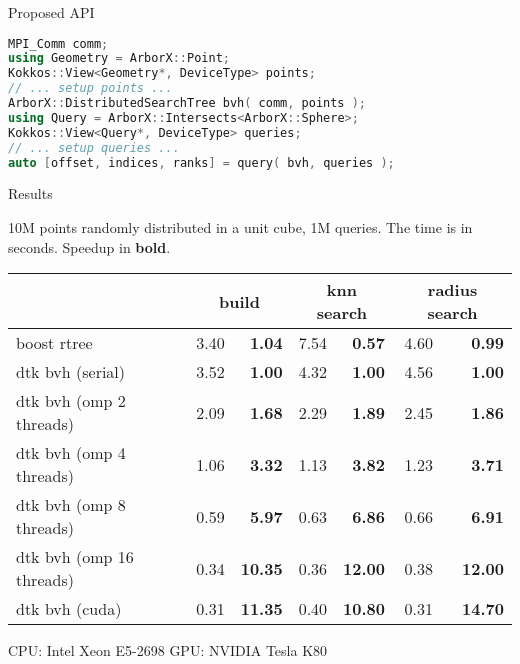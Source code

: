 \documentclass[final,hyperref={pdfpagelabels=false}]{beamer}
\begin{document}
\begin{frame}[t,fragile]
\begin{columns}[t]
\begin{column}{.480\textwidth}
\begin{block}{\centering Proposed API}

\begin{lstlisting}[language=C++]
MPI_Comm comm;
using Geometry = ArborX::Point;
Kokkos::View<Geometry*, DeviceType> points;
// ... setup points ...
ArborX::DistributedSearchTree bvh( comm, points );
using Query = ArborX::Intersects<ArborX::Sphere>;
Kokkos::View<Query*, DeviceType> queries;
// ... setup queries ...
auto [offset, indices, ranks] = query( bvh, queries );
\end{lstlisting}

\end{block}

\begin{block}{\centering Results}


10M points randomly distributed in a unit cube, 1M queries. The time is in seconds. Speedup in {\bf bold}.
\begin{table}
  \centering
  \begin{tabular}{l@{\hskip 50pt}cr@{\hskip 50pt}cr@{\hskip 50pt}cr}
    \toprule
                             & \multicolumn{2}{c}{build}    & \multicolumn{2}{c}{knn search} & \multicolumn{2}{c}{radius search} \\
    \midrule
    boost rtree              & 3.40   & {\bf 1.04}   & 7.54       & {\bf 0.57}   & 4.60          & {\bf 0.99} \\
    dtk bvh (serial)         & 3.52   & {\bf 1.00}   & 4.32       & {\bf 1.00}   & 4.56          & {\bf 1.00} \\
    dtk bvh (omp 2 threads)  & 2.09   & {\bf 1.68}   & 2.29       & {\bf 1.89}   & 2.45          & {\bf 1.86} \\
    dtk bvh (omp 4 threads)  & 1.06   & {\bf 3.32}   & 1.13       & {\bf 3.82}   & 1.23          & {\bf 3.71} \\
    dtk bvh (omp 8 threads)  & 0.59   & {\bf 5.97}   & 0.63       & {\bf 6.86}   & 0.66          & {\bf 6.91} \\
    dtk bvh (omp 16 threads) & 0.34   & {\bf 10.35}  & 0.36       & {\bf 12.00}  & 0.38          & {\bf 12.00}\\
    dtk bvh (cuda)           & 0.31   & {\bf 11.35}  & 0.40       & {\bf 10.80}  & 0.31          & {\bf 14.70}\\
    \bottomrule
  \end{tabular}
\end{table}
\begin{center}
  \small
  CPU: Intel Xeon E5-2698 \qquad GPU: NVIDIA Tesla K80
\end{center}


\end{block}
\end{column}
\end{columns}
\end{frame}
\end{document}
